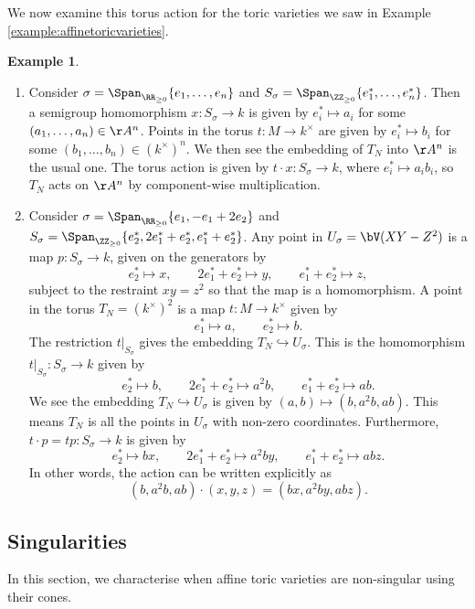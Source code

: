 \documentclass[12pt]{amsart}
\theoremstyle{plain}
\theoremstyle{definition}
\newtheorem{example}[theorem]{Example}
\begin{document}
We now examine this torus action for the toric varieties we saw in Example \ref{example:affinetoricvarieties}.

\begin{example}
\begin{enumerate}
\item Consider $\sigma = \Span_{\RR_{\ge 0}}\{e_1, \ldots, e_n\}$ and $S_\sigma = \Span_{\ZZ_{\ge 0}}\{e_1^*, \ldots, e_n^*\}$.
Then a semigroup homomorphism $x : S_\sigma \to k$ is given by $e_i^* \mapsto a_i$ for some $(a_1, \ldots, a_n) \in \AA^n$.
Points in the torus $t : M \to k^\times$ are given by $e_i^* \mapsto b_i$ for some $(b_1, \ldots, b_n)\in(k^\times)^n$.
We then see the embedding of $T_N$ into $\AA^n$ is the usual one.
The torus action is given by $t\cdot x : S_\sigma \to k$, where $e_i^* \mapsto a_i b_i$, so $T_N$ acts on $\AA^n$ by component-wise multiplication.
\item Consider $\sigma = \Span_{\RR_{\ge 0}} \{e_1, -e_1 + 2 e_2\}$ and $S_\sigma = \Span_{\ZZ_{\ge 0}}\{e_2^*, 2e_1^*+e_2^*, e_1^*+e_2^*\}$.
Any point in $U_\sigma = \bV(XY- Z^2)$ is a map $p : S_\sigma \to k$, given on the generators by
$$e_2^* \mapsto x, \qquad 2e_1^*+e_2^* \mapsto y, \qquad e_1^*+e_2^* \mapsto z,$$
subject to the restraint $xy=z^2$ so that the map is a homomorphism.
A point in the torus $T_N = (k^\times)^2$ is a map $t : M \to k^\times$ given by
$$e_1^* \mapsto a, \qquad e_2^* \mapsto b.$$
The restriction $\left. t \right|_{S_\sigma}$ gives the embedding $T_N \hookrightarrow U_\sigma$.
This is the homomorphism $\left. t \right|_{S_\sigma} : S_\sigma \to k$ given by
$$e_2^* \mapsto b, \qquad 2e_1^*+e_2^* \mapsto a^2 b, \qquad e_1^*+e_2^* \mapsto ab.$$
We see the embedding $T_N \hookrightarrow U_\sigma$ is given by $(a, b) \mapsto (b, a^2 b, ab)$.
This means $T_N$ is all the points in $U_\sigma$ with non-zero coordinates.
Furthermore, $t\cdot p = tp : S_\sigma \to k$ is given by
$$e_2^* \mapsto bx, \qquad 2e_1^*+e_2^* \mapsto a^2 by, \qquad e_1^*+e_2^* \mapsto abz.$$
In other words, the action can be written explicitly as
$$(b, a^2b, ab) \cdot (x, y, z) = (bx, a^2by, abz).$$
\end{enumerate}
\end{example}


\subsection{Singularities}
In this section, we characterise when affine toric varieties are non-singular using their cones.
\end{document}
